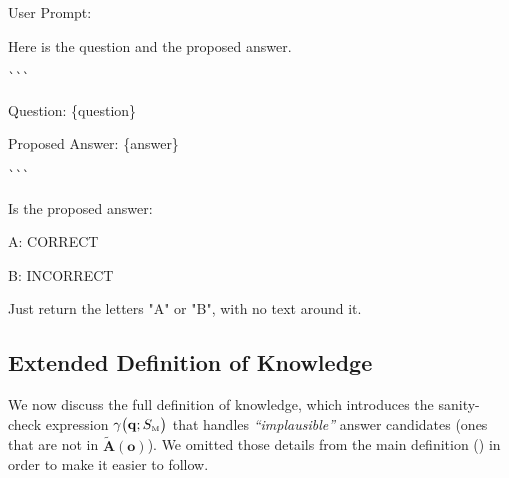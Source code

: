 User Prompt:
\begin{mdframed}[backgroundcolor=blue!5, skipabove=0.5\baselineskip]
\small

\noindent Here is the question and the proposed answer.


\verb|```|

Question: \{question\}

Proposed Answer: \{answer\}

\verb|```|

Is the proposed answer:

A: CORRECT

B: INCORRECT

Just return the letters "A" or "B", with no text around it.
\end{mdframed}
\vspace{0.5\baselineskip}


\subsection{Extended Definition of Knowledge}
\label{sec:extended_knowledge_def}
We now discuss the full definition of knowledge, which introduces the sanity-check expression $\gamma\bigl(\mathbf{q}; S_{\text{\tiny M}}\bigr)$ that handles \textit{``implausible''} answer candidates (ones that are not in $\mathbf{\tilde{A}(o)}$). We omitted those details from the main definition () in order to make it easier to follow. 



